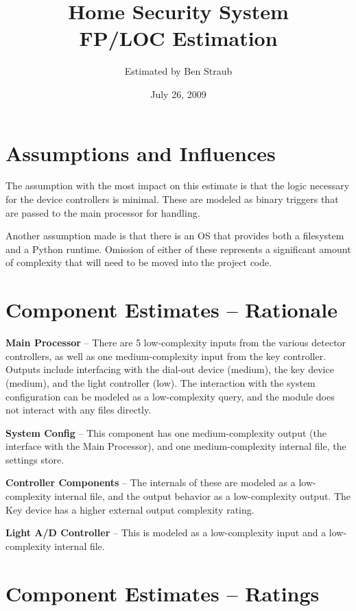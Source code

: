 \documentclass[11pt]{article}
\begin{document}
\title{Home Security System\\FP/LOC Estimation}
\author{Estimated by Ben Straub}
\date{July 26, 2009}
\maketitle




\section{Assumptions and Influences}
The assumption with the most impact on this estimate is that the logic necessary for the device
controllers is minimal.  These are modeled as binary triggers that are passed to the main processor
for handling.

Another assumption made is that there is an OS that provides both a filesystem and a Python runtime.
Omission of either of these represents a significant amount of complexity that will need to be moved
into the project code.

\section{Component Estimates -- Rationale}

\textbf{Main Processor} -- There are 5 low-complexity inputs from the various detector controllers,
as well as one medium-complexity input from the key controller.  Outputs include interfacing with
the dial-out device (medium), the key device (medium), and the light controller (low).  The
interaction with the system configuration can be modeled as a low-complexity query, and the module
does not interact with any files directly.

\textbf{System Config} -- This component has one medium-complexity output (the interface with the Main
Processor), and one medium-complexity internal file, the settings store.

\textbf{Controller Components} -- The internals of these are modeled as a low-complexity internal
file, and the output behavior as a low-complexity output.  The Key device has a higher external
output complexity rating.

\textbf{Light A/D Controller} -- This is modeled as a low-complexity input and a low-complexity
internal file.

\section{Component Estimates -- Ratings}
\end{document}
